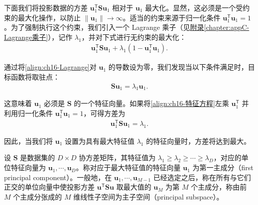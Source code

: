 \documentclass[../../main.tex]{subfiles}
\begin{document}
下面我们将投影数据的方差 $\bm{u}_1^{\mathsf T}\bm{S}\bm{u}_1$ 相对于 $\bm{u}_1$ 最大化。显然，这必须是一个受约束的最大化操作，以防止 $\|\bm{u}_1\|\rightarrow\infty$。适当的约束来源于归一化条件 $\bm{u}_1^{\mathsf T}\bm{u}_1=1$。为了强制执行这个约束，我们引入一个 Lagrange 乘子（见\hyperref[chapter:appC-Lagrange乘子]{附录\ref*{chapter:appC-Lagrange乘子}}），记作 $\lambda_1$，并对下式进行无约束的最大化：
\begin{align}
  \bm{u}_1^{\mathsf T}\bm{S}\bm{u}_1+\lambda_1(1-\bm{u}_1^{\mathsf T}\bm{u}_1).
  \label{align:ch16-Lagrange}
\end{align}

通过将\eqref{align:ch16-Lagrange}对 $\bm{u}_1$ 的导数设为零，我们发现当以下条件满足时，目标函数将取驻点：
\begin{align}
  \bm{S}\bm{u}_1=\lambda_1\bm{u}_1.
  \label{align:ch16-特征方程}
\end{align}

这意味着 $\bm{u}_1$ 必须是 $\bm{S}$ 的一个特征向量。如果将\eqref{align:ch16-特征方程}左乘 $\bm{u}_1^{\mathsf T}$ 并利用归一化条件 $\bm{u}_1^{\mathsf T}\bm{u}_1=1$，可得方差为
\begin{align}
  \bm{u}_1^{\mathsf T}\bm{S}\bm{u}_1=\lambda_1.
  \label{align:ch16-特征值方差}
\end{align}

因此，当我们将 $\bm{u}_1$ 设置为具有最大特征值 $\lambda_1$ 的特征向量时，方差将达到最大。

\begin{definition}[主成分与主子空间]\label{definition:ch16-主成分}
设 $\bm{S}$ 是数据集的 $D\times D$ 协方差矩阵，其特征值为 $\lambda_1\geqslant\lambda_2\geqslant\cdots\geqslant\lambda_D$，对应的单位特征向量为 $\bm{u}_1,\cdots,\bm{u}_D$。称对应于最大特征值的特征向量 $\bm{u}_1$ 为第一主成分（first principal component）。一般地，在 $\bm{u}_1,\cdots,\bm{u}_{M-1}$ 已经选定之后，称在所有与它们正交的单位向量中使投影方差 $\bm{u}^{\mathsf T}\bm{S}\bm{u}$ 取最大值的 $\bm{u}_M$ 为第 $M$ 个主成分，称由前 $M$ 个主成分张成的 $M$ 维线性子空间为主子空间（principal subspace）。
\end{definition}
\end{document}
